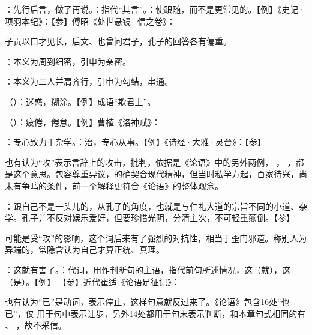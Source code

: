 {
\begin{lyitemize}
\item {}：先行后言，做了再说。：指代“其言”。：使跟随，而不是更常见的。【例】《史记·项羽本纪》：【参】傅昭《处世悬镜·信之卷》：
\end{lyitemize}
子贡以口才见长，后文、也曾问君子，孔子的回答各有偏重。
}
{} %


{
\item {}：本义为周到细密，引申为亲密。
\item {}：本义为二人并肩齐行，引申为勾结，串通。
}  %
{}


{
\item {}（）：迷惑，糊涂。【例】成语“欺君上”。
\item {}（）：疲倦，倦怠。【例】曹植《洛神赋》：
}
{}


{
\item {}：专心致力于杂学。：治，专心从事。【例】《诗经·大雅·灵台》：【参】

也有认为“攻”表示言辞上的攻击，批判，依据是《论语》中的另外两例， ， ，都是这个意思。包容尊重异议，的确契合现代精神，但当时私学方起，百家待兴，尚未有争鸣的条件，前一个解释更符合《论语》的整体观念。

：跟自己不是一头儿的，从孔子的角度，也就是与仁礼大道的宗旨不同的小道、杂学。孔子并不反对娱乐爱好，但要珍惜光阴，分清主次，不可轻重颠倒。【参】  

可能是受“攻”的影响，这个词后来有了强烈的对抗性，相当于歪门邪道。称别人为异端的，常隐含认为自己才算正统、真理。

\item {}：这就有害了。：代词，用作判断句的主语，指代前句所述情况，这（就），这（是）。【例】 【参】近代崔适《论语足征记》：

也有认为“已”是动词，表示停止，这样句意就反过来了。《论语》包含16处“也已”，仅  用于句中表示让步，另外14处都用于句末表示判断，和本章句式相同的有  、 ，故不采信。
}
{}


